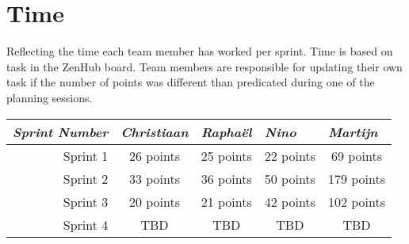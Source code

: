 \section{Time}
Reflecting the time each team member has worked per sprint. Time is based on task in the ZenHub board. Team members are responsible for updating their own task if the number of points was different than predicated during one of the planning sessions.\newline

\begin{table}[h]
	\begin{tabular}{@{}rcccc@{}}
		\toprule
		\multicolumn{1}{l}{\textit{\textbf{Sprint Number}}} & \multicolumn{1}{l}{\textit{\textbf{Christiaan}}} & \multicolumn{1}{l}{\textit{\textbf{Rapha\"el}}} & \multicolumn{1}{l}{\textit{\textbf{Nino}}} & \multicolumn{1}{l}{\textit{\textbf{Martijn}}} \\ \midrule
		Sprint 1 & 26 points & 25 points & 22 points & 69 points \\
		Sprint 2 & 33 points & 36 points & 50 points & 179 points \\
		Sprint 3 & 20 points & 21 points & 42 points & 102 points \\
		Sprint 4 & TBD & TBD & TBD & TBD \\ \bottomrule
	\end{tabular}
\end{table}
